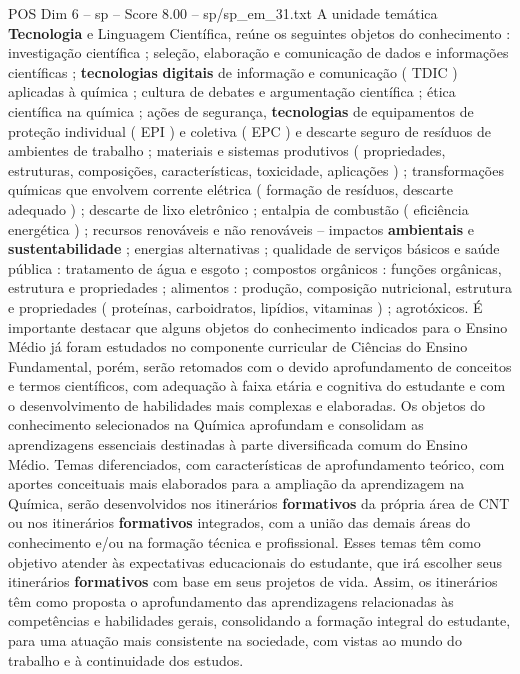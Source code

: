 \begin{textsample}{POS Dim 6 – sp – Score 8.00 – sp/sp\_em\_31.txt}
A unidade temática \textbf{Tecnologia} e Linguagem Científica, reúne os seguintes objetos do conhecimento : investigação científica ; seleção, elaboração e comunicação de dados e informações científicas ; \textbf{tecnologias} \textbf{digitais} de informação e comunicação ( TDIC ) aplicadas à química ; cultura de debates e argumentação científica ; ética científica na química ; ações de segurança, \textbf{tecnologias} de equipamentos de proteção individual ( EPI ) e coletiva ( EPC ) e descarte seguro de resíduos de ambientes de trabalho ; materiais e sistemas produtivos ( propriedades, estruturas, composições, características, toxicidade, aplicações ) ; transformações químicas que envolvem corrente elétrica ( formação de resíduos, descarte adequado ) ; descarte de lixo eletrônico ; entalpia de combustão ( eficiência energética ) ; recursos renováveis e não renováveis – impactos \textbf{ambientais} e \textbf{sustentabilidade} ; energias alternativas ; qualidade de serviços básicos e saúde pública : tratamento de água e esgoto ; compostos orgânicos : funções orgânicas, estrutura e propriedades ; alimentos : produção, composição nutricional, estrutura e propriedades ( proteínas, carboidratos, lipídios, vitaminas ) ; agrotóxicos.
É importante destacar que alguns objetos do conhecimento indicados para o Ensino Médio já foram estudados no componente curricular de Ciências do Ensino Fundamental, porém, serão retomados com o devido aprofundamento de conceitos e termos científicos, com adequação à faixa etária e cognitiva do estudante e com o desenvolvimento de habilidades mais complexas e elaboradas.
Os objetos do conhecimento selecionados na Química aprofundam e consolidam as aprendizagens essenciais destinadas à parte diversificada comum do Ensino Médio.
Temas diferenciados, com características de aprofundamento teórico, com aportes conceituais mais elaborados para a ampliação da aprendizagem na Química, serão desenvolvidos nos itinerários \textbf{formativos} da própria área de CNT ou nos itinerários \textbf{formativos} integrados, com a união das demais áreas do conhecimento e/ou na formação técnica e profissional.
Esses temas têm como objetivo atender às expectativas educacionais do estudante, que irá escolher seus itinerários \textbf{formativos} com base em seus projetos de vida.
Assim, os itinerários têm como proposta o aprofundamento das aprendizagens relacionadas às competências e habilidades gerais, consolidando a formação integral do estudante, para uma atuação mais consistente na sociedade, com vistas ao mundo do trabalho e à continuidade dos estudos.

\end{textsample}
